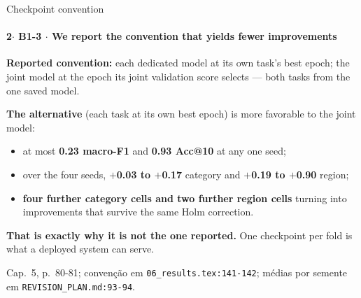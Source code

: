 \documentclass{beamer}
\begin{document}
\begin{frame}[noframenumbering]{Checkpoint convention}
    \framesubtitle{\normalsize 2$\cdot$ \textbf{B1-3} $\cdot$ We report the convention that yields fewer improvements}
    \hypertarget{b13}{}
    \small
    \textbf{Reported convention:} each dedicated model at its own task's best epoch; the joint model at the epoch its joint validation score selects --- both tasks from the one saved model.

    \textbf{The alternative} (each task at its own best epoch) is more favorable to the joint model:
    \begin{itemize}\setlength{\itemsep}{0pt}\setlength{\parskip}{0pt}
        \item at most \textbf{0.23 macro-F1} and \textbf{0.93 Acc@10} at any one seed;
        \item over the four seeds, \textbf{$+$0.03 to $+$0.17} category and \textbf{$+$0.19 to $+$0.90} region;
        \item \textbf{four further category cells and two further region cells} turning into improvements that survive the same Holm correction.
    \end{itemize}
    \textcolor{alert}{\textbf{That is exactly why it is not the one reported.}} One checkpoint per fold is what a deployed system can serve.
    \vfill
    {\scriptsize
    \begin{minipage}[b]{0.775\linewidth}\raggedright\textcolor{black!70}{Cap.~5, p.~80-81; convenção em \texttt{06\_results.tex:141-142}; médias por semente em \texttt{REVISION\_PLAN.md:93-94}.}\end{minipage}\hfill
    \begin{minipage}[b]{0.20\linewidth}\raggedleft \hyperlink{b0}{}\end{minipage}}
\end{frame}
\end{document}
